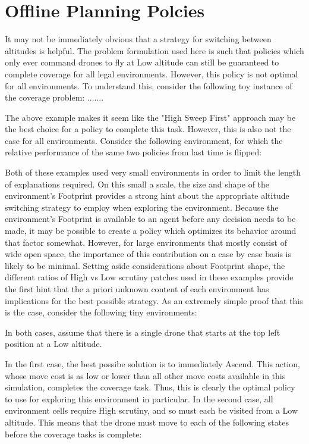 \chapter{Offline Planning Polcies}

It may not be immediately obvious that a strategy for switching between altitudes is helpful. The problem formulation used here is such that policies which only ever command drones to fly at Low altitude can still be guaranteed to complete coverage for all legal environments. However, this policy is not optimal for all environments. To understand this, consider the following toy instance of the coverage problem: .......


The above example makes it seem like the "High Sweep First" approach may be the best choice for a policy to complete this task. However, this is also not the case for all environments. Consider the following environment, for which the relative performance of the same two policies from last time is flipped:


Both of these examples used very small environments in order to limit the length of explanations required. On this small a scale, the size and shape of the environment's Footprint provides a strong hint about the appropriate altitude switching strategy to employ when exploring the environment. Because the environment's Footprint is available to an agent before any decision needs to be made, it may be possible to create a policy which optimizes its behavior around that factor somewhat. However, for large environments that mostly consist of wide open space, the importance of this contribution on a case by case basis is likely to be minimal. Setting aside considerations about Footprint shape, the different ratios of High vs Low scrutiny patches used in these examples provide the first hint that the a priori unknown content of each environment has implications for the best possible strategy. As an extremely simple proof that this is the case, consider the following tiny environments:



In both cases, assume that there is a single drone that starts at the top left position at a Low altitude.

In the first case, the best possibe solution is to immediately Ascend. This action, whose move cost is as low or lower than all other move costs available in this simulation, completes the coverage task. Thus, this is clearly the optimal policy to use for exploring this environment in particular. In the second case, all environment cells require High scrutiny, and so must each be visited from a Low altitude. This means that the drone must move to each of the following states before the coverage tasks is complete:

